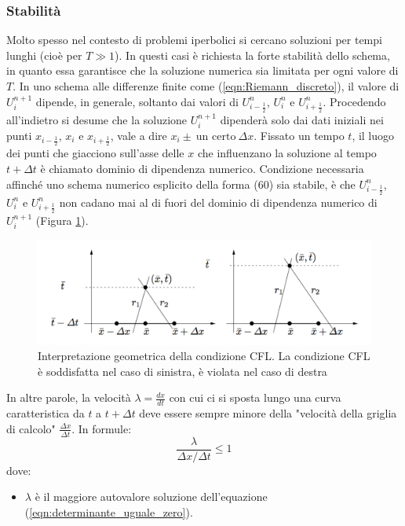 \documentclass[12pt]{article} %
\begin{document}
\subsubsection{Stabilità}
\noindent Molto spesso nel contesto di problemi iperbolici si cercano soluzioni per tempi lunghi (cioè per $T\gg1$). In questi casi è richiesta la forte stabilità dello schema, in quanto essa garantisce che la soluzione numerica sia limitata per ogni valore di $T$. In uno schema alle differenze finite come (\ref{eqn:Riemann_discreto}), il valore di $U_i^{n+1}$ dipende, in generale, soltanto dai valori di $U^{n}_{i-\frac{1}{2}}$, $U^{n}_{i}$ e $U^{n}_{i+\frac{1}{2}}$. Procedendo all'indietro si desume che la soluzione $U_i^{n+1}$ dipenderà solo dai dati iniziali nei punti $x_{i-\frac{1}{2}}$, $x_i$ e $x_{i+\frac{1}{2}}$, vale a dire $x_i\pm\:\textrm{un certo}\:\Delta x$. Fissato un tempo $t$, il luogo dei punti che giacciono sull'asse delle $x$ che influenzano la soluzione al tempo $t+\Delta t$ è chiamato dominio di dipendenza numerico. Condizione necessaria affinché uno schema numerico esplicito della forma (60) sia stabile, è che $U^{n}_{i-\frac{1}{2}}$, $U^{n}_{i}$ e $U^{n}_{i+\frac{1}{2}}$ non cadano mai al di fuori del dominio di dipendenza numerico di $U_i^{n+1}$ (Figura \ref{fig:CFL}). 
\begin{figure}
    \centering
    \includegraphics[width=\textwidth]{CFL.png}
    \caption{Interpretazione geometrica della condizione CFL. La condizione CFL è soddisfatta nel caso di sinistra, è violata nel caso di destra}
    \label{fig:CFL}
\end{figure}
\noindent In altre parole, la velocità $\lambda=\frac{dx}{dt}$ con cui ci si sposta lungo una curva caratteristica da $t$ a $t+\Delta t$ deve essere sempre minore della "velocità della griglia di calcolo" $\frac{\Delta x}{\Delta t}$. In formule:
\begin{equation}
    \frac{\lambda}{\Delta x/\Delta t}\leq1
    \label{eqn:Courant}
\end{equation}
\noindent dove:
\begin{itemize}
    \item $\lambda$ è il maggiore autovalore soluzione dell'equazione (\ref{eqn:determinante_uguale_zero}).
\end{itemize}
\end{document}
